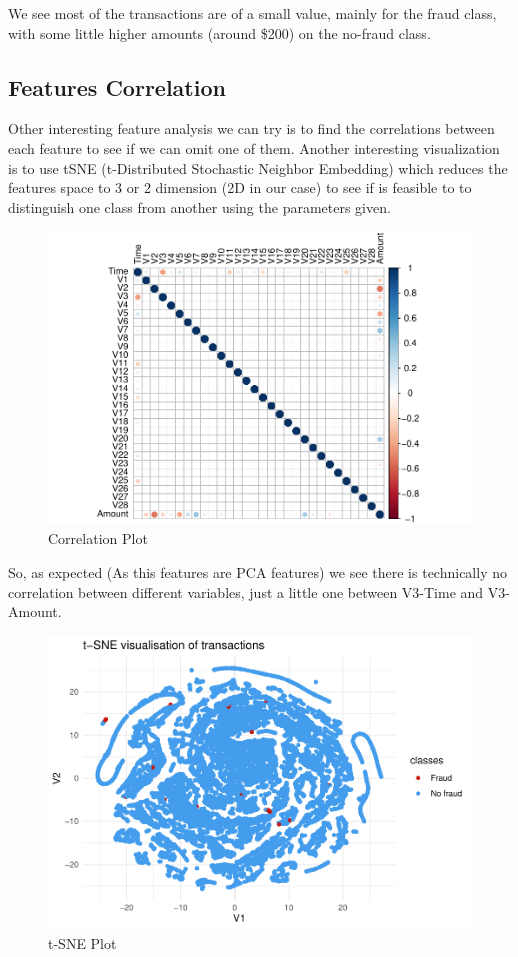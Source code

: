 \documentclass[
]{article}
\begin{document}
We see most of the transactions are of a small value, mainly for the
fraud class, with some little higher amounts (around \$200) on the
no-fraud class.

\hypertarget{features-correlation}{%
\subsection{Features Correlation}\label{features-correlation}}

Other interesting feature analysis we can try is to find the
correlations between each feature to see if we can omit one of them.
Another interesting visualization is to use tSNE (t-Distributed
Stochastic Neighbor Embedding) which reduces the features space to 3 or
2 dimension (2D in our case) to see if is feasible to to distinguish one
class from another using the parameters given.

\begin{figure}[H]

{\centering \includegraphics[width=0.7\linewidth]{fraudDetectionReport_files/figure-latex/correlationPlot-1} 

}

\caption{Correlation Plot}\label{fig:correlationPlot}
\end{figure}

So, as expected (As this features are PCA features) we see there is
technically no correlation between different variables, just a little
one between V3-Time and V3-Amount.

\begin{figure}[H]

{\centering \includegraphics[width=0.7\linewidth]{fraudDetectionReport_files/figure-latex/tSNE_Plot-1} 

}

\caption{t-SNE Plot}\label{fig:tSNE_Plot}
\end{figure}
\end{document}
